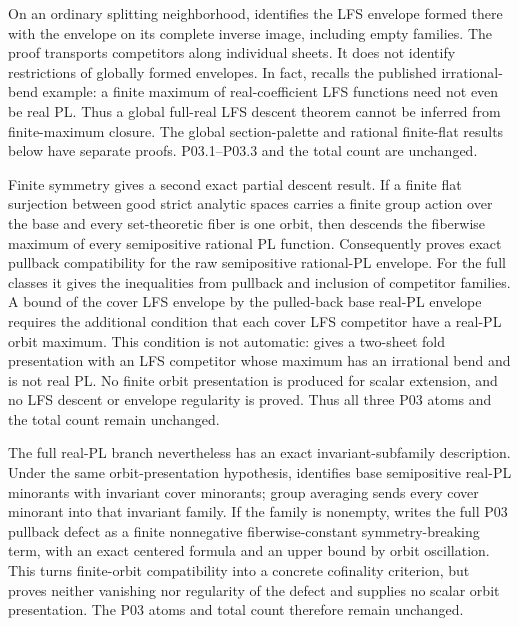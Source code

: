 On an ordinary splitting neighborhood,
 identifies the LFS envelope formed
there with the envelope on its complete inverse image, including empty
families. The proof transports competitors along individual sheets. It
does not identify restrictions of globally formed envelopes. In fact,
 recalls the published irrational-bend
example: a finite maximum of real-coefficient LFS functions need not even
be real PL. Thus a global full-real LFS descent theorem cannot be inferred
from finite-maximum closure. The global section-palette and rational
finite-flat results below have separate proofs. P03.1--P03.3 and the total
count are unchanged.

Finite symmetry gives a second exact partial descent result.  If a finite
flat surjection between good strict analytic spaces carries a finite group
action over the base and every set-theoretic fiber is one orbit, then
 descends the fiberwise maximum of every
semipositive rational PL function.  Consequently
 proves exact pullback compatibility
for the raw semipositive rational-PL envelope. For the full classes it gives
the inequalities from pullback and inclusion of competitor families. A
bound of the cover LFS envelope by the pulled-back base real-PL envelope
requires the additional condition that each cover LFS competitor have a
real-PL orbit maximum. This condition is not automatic:
 gives a two-sheet fold
presentation with an LFS competitor whose maximum has an irrational bend
and is not real PL. No
finite orbit presentation is produced for scalar extension, and no LFS
descent or envelope regularity is proved.  Thus all three P03 atoms and the
total count remain unchanged.

The full real-PL branch nevertheless has an exact invariant-subfamily
description.  Under the same orbit-presentation hypothesis,
 identifies base semipositive real-PL
minorants with invariant cover minorants; group averaging sends every cover
minorant into that invariant family.  If the family is nonempty,
 writes the full P03 pullback defect
as a finite nonnegative fiberwise-constant symmetry-breaking term, with an
exact centered formula and an upper bound by orbit oscillation.  This turns
finite-orbit compatibility into a concrete cofinality criterion, but proves
neither vanishing nor regularity of the defect and supplies no scalar orbit
presentation.  The P03 atoms and total count therefore remain unchanged.

